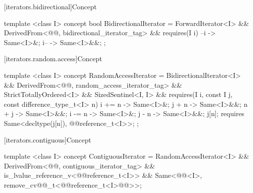 [iterators.bidirectional]{Concept }


%
\begin{codeblock}
  template <class I>
  concept bool BidirectionalIterator =
    ForwardIterator<I> &&
    DerivedFrom<@@, bidirectional_iterator_tag> &&
    requires(I i) {
      { --i } -> Same<I>&;
      { i-- } -> Same<I>&&;
    };
\end{codeblock}

[iterators.random.access]{Concept }


%
\begin{codeblock}
  template <class I>
  concept RandomAccessIterator =
    BidirectionalIterator<I> &&
    DerivedFrom<@@, random_access_iterator_tag> &&
    StrictTotallyOrdered<I> &&
    SizedSentinel<I, I> &&
    requires(I i, const I j, const difference_type_t<I> n) {
      { i += n } -> Same<I>&;
      { j + n }  -> Same<I>&&;
      { n + j }  -> Same<I>&&;
      { i -= n } -> Same<I>&;
      { j - n }  -> Same<I>&&;
      j[n];
      requires Same<decltype(j[n]), @@reference_t<I>>;
    };
\end{codeblock}

[iterators.contiguous]{Concept }


%
\begin{codeblock}
  template <class I>
  concept ContiguousIterator =
    RandomAccessIterator<I> &&
    DerivedFrom<@@, contiguous_iterator_tag> &&
    is_lvalue_reference_v<@@reference_t<I>> &&
    Same<@@<I>, remove_cv@@_t<@@reference_t<I>@\removed{>}@>>;
\end{codeblock}


